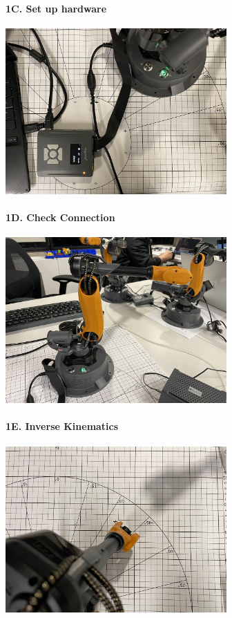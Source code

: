 \newpage
\paragraph{1C. Set up hardware}
\begin{center}
    \includegraphics[height=2.5in]{image/1c_power.jpg}
\end{center}

\paragraph{1D. Check Connection}
\begin{center}
    \includegraphics[height=2.5in]{image/1d_homing.jpg}
\end{center}

\newpage
\paragraph{1E. Inverse Kinematics}
\begin{center}
    \includegraphics[height=2.5in]{image/1e_targeta.jpg}
\end{center}

